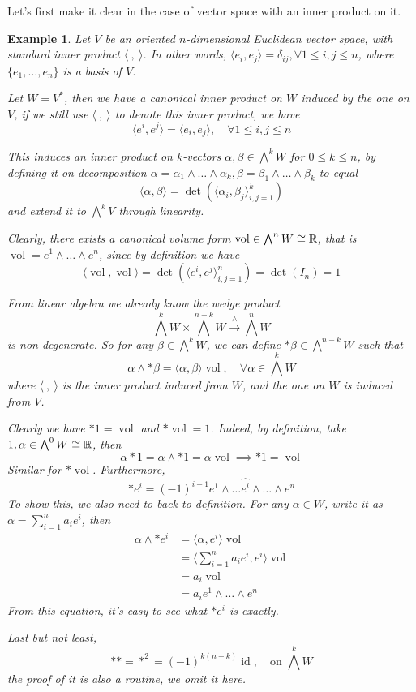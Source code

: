 \documentclass[11pt]{amsart}
\numberwithin{equation}{section}
\theoremstyle{plain}
\theoremstyle{plain}
\newtheorem{exsub}[thmsub]{Example}
\numberwithin{equation}{section}
\begin{document}
Let's first make it clear in the case of vector space with an inner product on it.
\begin{exsub}\normalfont
Let $V$ be an oriented $n$-dimensional Euclidean vector space, with standard inner product $\langle~,~\rangle$. In other words, $\langle e_i,e_j\rangle=\delta_{ij},\forall1\leq i,j\leq n$, where $\{e_1,\dots,e_n\}$ is a basis of $V$.

Let $W=V^*$, then we have a canonical inner product on $W$ induced by the one on $V$, if we still use $\langle~,~\rangle$ to denote this inner product, we have
$$
\langle e^i,e^j\rangle=\langle e_i,e_j\rangle,\quad\forall 1\leq i,j\leq n
$$

This induces an inner product on $k$-vectors $\alpha,\beta\in\bigwedge^kW$ for $0\leq k\leq n$, by defining it on decomposition $\alpha=\alpha_1\wedge\dots\wedge\alpha_k,\beta=\beta_1\wedge\dots\wedge\beta_k$ to equal
$$
\langle\alpha, \beta\rangle=\operatorname{det}(\langle\alpha_{i}, \beta_{j}\rangle_{i, j=1}^{k})
$$
and extend it to $\bigwedge^kV$ through linearity.

Clearly, there exists a canonical volume form $\operatorname{vol}\in\bigwedge^nW\cong\Bbb{R}$, that is $\operatorname{vol}=e^1\wedge\dots\wedge e^n$, since
by definition we have
$$
\langle\operatorname{vol},\operatorname{vol}\rangle=\operatorname{det}(\langle e^i,e^j\rangle_{i,j=1}^n)=\operatorname{det}(I_n)=1
$$

From linear algebra we already know the wedge product
$$
\bigwedge^kW\times\bigwedge^{n-k}W\stackrel{\wedge}{\longrightarrow}\bigwedge^nW
$$
is non-degenerate. So for any $\beta\in\bigwedge^kW$, we can define $*\beta\in\bigwedge^{n-k}W$ such that 
$$
\alpha\wedge*\beta=\langle\alpha,\beta\rangle\operatorname{vol},\quad \forall\alpha\in\bigwedge^kW
$$
where $\langle~,~\rangle$ is the inner product induced from $W$, and the one on $W$ is induced from $V$.

Clearly we have $*1=\operatorname{vol}$ and $*\operatorname{vol}=1$. Indeed, by definition, take $1,\alpha\in\bigwedge^0W\cong\Bbb{R}$, then
$$
\alpha*1=\alpha\wedge*1=\alpha\operatorname{vol}\implies *1=\operatorname{vol}
$$
Similar for $*\operatorname{vol}$. Furthermore,
$$
*e^i=(-1)^{i-1}e^1\wedge\dots\widehat{e^i}\wedge\dots\wedge e^n
$$
To show this, we also need to back to definition. For any $\alpha\in W$, write it as $\alpha=\sum_{i=1}^na_ie^i$, then
$$
\begin{aligned}
\alpha\wedge*e^{i}&=\langle\alpha,e^i\rangle\operatorname{vol}\\
&=\langle\sum_{i=1}^na_ie^i,e^i\rangle\operatorname{vol}\\
&=a_i\operatorname{vol}\\
&=a_ie^1\wedge\dots\wedge e^n
\end{aligned}
$$
From this equation, it's easy to see what $*e^i$ is exactly.

Last but not least, 
$$
**=*^2=(-1)^{k(n-k)}\operatorname{id},\quad \text{on }\bigwedge^kW
$$
the proof of it is also a routine, we omit it here.
\end{exsub}
\end{document}
